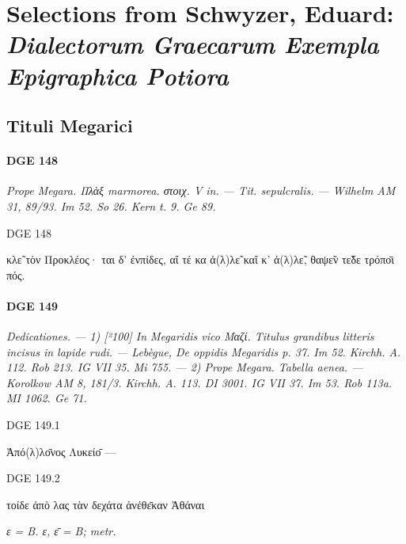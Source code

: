 \chapter{Selections from Schwyzer, Eduard: \textit{Dialectorum Graecarum Exempla Epigraphica
Potiora}}

\section{Tituli Megarici}

\subsubsection{DGE 148}
\textit{Prope Megara.  \textgreek{Πλὰξ} marmorea.  \textgreek{στοιχ.}  V in. — Tit. sepulcralis. — Wilhelm AM 31, 89/93. Im 52. So 26. Kern t. 9. Ge 89.}
\begin{versi}{DGE 148}
\begin{greek}
κλ\~{ε} τὸν Προκ{\verso[1]}λέος· ται δ’ ἐνπίδες, αἴ τέ κα ἀ(λ)λ\~{ε} \; καἴ κ’ {\verso} ἀ(λ)λ\~{ε}, θαψ\~{ε}ν τε̃δε τρ{\verso}όπ\={ο}ι πός.
\end{greek}
\end{versi}

\hrulefill

\subsubsection{DGE 149}
\textit{Dedicationes. — 1) [²100] In Megaridis vico \textgreek{Μαζί}. Titulus grandibus litteris incisus in lapide rudi. — Lebègue, De oppidis Megaridis p. 37. Im 52. Kirchh. A. 112. Rob 213. IG VII 35. Mi 755. — 2) Prope Megara. Tabella aenea. — Korolkow AM 8, 181/3. Kirchh. A. 113. DI 3001. IG VII 37. Im 53. Rob 113a. MI 1062. Ge 71.}
\begin{versi}{DGE 149.1}
\begin{greek}
Ἀπό(λ)λ\={ο}νος {\verso[1]} Λυκεί\={ο} —
\end{greek}
\end{versi}

\begin{versi}{DGE 149.2}
\begin{greek}
τ{\rbrk}οίδε ἀπὸ λας τὰν δεχάτα {\verso} ἀνέθ\={ε}καν Ἀθά{\verso}ναι
\end{greek}
\end{versi}
\textit{\textgreek{ε} = B. \textgreek{ε, \={ε}} = B; metr.}

\hrulefill

